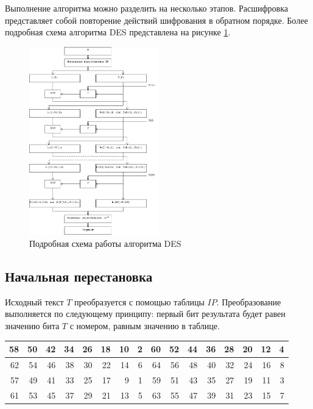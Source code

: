 Выполнение алгоритма можно разделить на несколько этапов. Расшифровка представляет собой повторение действий шифрования в обратном порядке. Более подробная схема алгоритма DES представлена на рисунке \ref{fig:des_1}.

\newpage

\begin{figure}[h!]
\centering
\includegraphics[width=0.5\textwidth]{assets/des.png}
\caption{Подробная схема работы алгоритма DES}
\label{fig:des_1}
\end{figure}

\subsection{Начальная перестановка}

Исходный текст $T$ преобразуется с помощью таблицы $IP$. Преобразование выполняется по следующему принципу: первый бит результата будет равен значению бита $T$ с номером, равным значению в таблице.

\begin{center}
\begin{tabular}{|r|r|r|r|r|r|r|r|r|r|r|r|r|r|r|r|} 
 \hline
58 & 50 & 42 & 34 & 26 & 18 & 10 & 2 & 60 & 52 & 44 & 36 & 28 & 20 & 12 & 4 \\ 
\hline
62 & 54 & 46 & 38 & 30 & 22 & 14 & 6 & 64 & 56 & 48 & 40 & 32 & 24 & 16 & 8 \\ 
\hline
57 & 49 & 41 & 33 & 25 & 17 & 9 & 1 & 59 & 51 & 43 & 35 & 27 & 19 & 11 & 3 \\ 
\hline
61 & 53 & 45 & 37 & 29 & 21 & 13 & 5 & 63 & 55 & 47 & 39 & 31 & 23 & 15 & 7 \\ 
\hline
\end{tabular}
\end{center}

